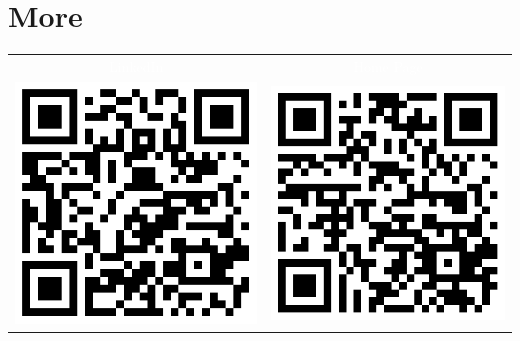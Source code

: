 \documentclass[a4paper]{article}
\begin{document}
\section*{\LARGE{More\newline}}

\begin{tabular}{c|c}  
	\cellcolor{black}\textcolor{white}{LinkedIn} & \cellcolor{black}\textcolor{white}{Home Page} \\
	\includegraphics[scale=0.4]{qrcode_lnkdn.png} &  \includegraphics[scale=0.4]{qrcode_hme.png} 
\end{tabular}
\end{document}
